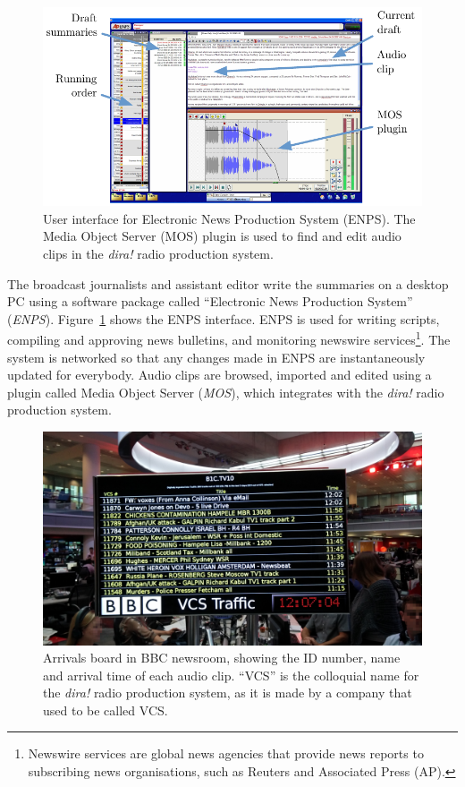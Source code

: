 \begin{figure}
  \centering
  \includegraphics[width=\columnwidth]{figs/news-enps-labelled.pdf}
  \caption{User interface for Electronic News Production System (ENPS). The Media Object Server (MOS) plugin is used to
  find and edit audio clips in the \textit{dira!} radio production system.}
  \label{fig:news-enps-edit}
\end{figure}

The broadcast journalists and assistant editor write the summaries on a desktop PC using a software package called
``Electronic News Production System'' (\textit{ENPS}). Figure~\ref{fig:news-enps-edit} shows the ENPS interface. ENPS
is used for writing scripts, compiling and approving news bulletins, and monitoring newswire services\footnote{Newswire
services are global news agencies that provide news reports to subscribing news organisations, such as Reuters and
Associated Press (AP).}. The system is networked so that any changes made in ENPS are instantaneously updated for
everybody. Audio clips are browsed, imported and edited using a plugin called Media Object Server (\textit{MOS}), which
integrates with the \textit{dira!} radio production system.

\begin{figure}
  \centering
  \includegraphics[width=\columnwidth]{figs/news-intake-pixelated.jpg}
  \caption{Arrivals board in BBC newsroom, showing the ID number, name and arrival time of each audio clip.  ``VCS'' is
  the colloquial name for the \textit{dira!} radio production system, as it is made by a company that used to be called
VCS.}
  \label{fig:news-arrivals}
\end{figure}

